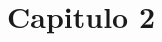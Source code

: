 \documentclass[
    a4paper,
    12pt
]{book}
\begin{document}
	\chapter{Capitulo 2}
	\lipsum[1-2]
%	
%
%
%


	
\end{document}
